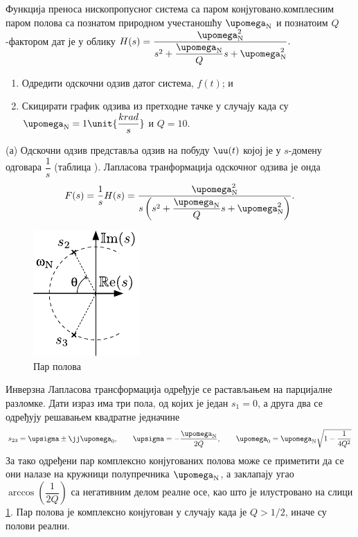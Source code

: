 \PID \label{z:lpf_q}
\mnImportant
Функција преноса нископропусног система 
са паром конјуговано.комплесним паром полова са познатом природном учестаношћу $\upomega_{\rm N}$ 
и познатоим $Q$-фактором дат је у облику 
$H(s) = \dfrac{\upomega_{\rm N}^2 }{s^2 +  \dfrac{\upomega_{\rm N}}{Q}s + \upomega_{\rm N}^2}.$
\begin{enumerate}[label=(\alph*)]
    \item Одредити одскочни одзив датог система, $f(t)$; и 
    \item Скицирати график одзива из претходне тачке у случају када су $\upomega_{\rm N} = 1\unit{\dfrac{krad}{s}}$ и $Q = 10$. 
\end{enumerate}

\RESENJE 

(а) Одскочни одзив представља одзив на побуду $\uu(t)$ којој је у $s$-домену одговара 
$\dfrac{1}{s}$ (таблица ). Лапласова транформација одскочног одзива је онда 
\begin{equation}
    F(s) = \dfrac{1}{s} H(s) =
    \dfrac{\upomega_{\rm N}^2 }{ s\left( s^2 +  \dfrac{\upomega_{\rm N}}{Q}s + \upomega_{\rm N}^2 \right)}. \label{eq:\ID.F}
\end{equation}

\noindent
\begin{minipage}{\textwidth}
\begin{figure}
    \includegraphics{fig/Q_polovi.pdf}
    \caption{Пар полова}
    \label{fig:\ID.polovi}
\end{figure}
Инверзна Лапласова трансформација одређује се растављањем на парцијалне разломке. Дати израз има три пола, 
од којих је један
$s_1 = 0$, а друга два се одређују решавањем квадратне једначине 
\begin{equation}
    s_{23} = \upsigma \pm \jj\upomega_0, \qquad \upsigma = -\dfrac{\upomega_{\rm N}}{2Q}, \qquad \upomega_0 = \upomega_{\rm N} \sqrt{1 - \dfrac{1}{4Q^2}} 
\end{equation}
За тако одређени пар комплексно конјугованих полова може се приметити да се они налазе на кружници полупречника $\upomega_{\rm N}$, а заклапају угао 
$\arccos\left(\dfrac{1}{2Q}\right)$ са негативним делом реалне осе, као што је илустровано на слици \ref{fig:\ID.polovi}. 
Пар полова је комплексно конјугован у случају када је $Q > 1/2$, иначе су полови реални.
\end{minipage} \\[5mm]
%

